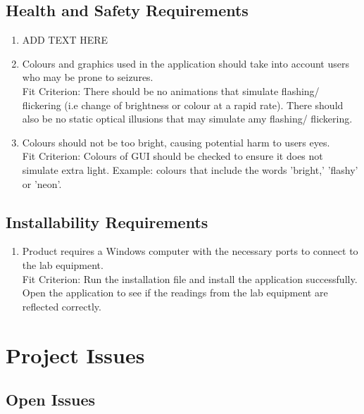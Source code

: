 \documentclass[12pt, titlepage]{article}
\begin{document}
\subsection{Health and Safety Requirements}
\begin{adjustwidth}{2.2em}{0pt}
\begin{enumerate}[{NFR-H}1.]
  \item ADD TEXT HERE
  \item Colours and graphics used in the application should take into account users who may be prone to seizures. \\
    Fit Criterion: There should be no animations that simulate flashing/ flickering (i.e change of brightness or colour at a rapid rate). There should also be no static optical illusions that may simulate amy flashing/ flickering.
    \item Colours should not be too bright, causing potential harm to users eyes. \\
    Fit Criterion: Colours of GUI should be checked to ensure it does not simulate extra light. Example: colours that include the words 'bright,' 'flashy' or 'neon'.
\end{enumerate}
\end{adjustwidth}

\subsection{Installability Requirements}
\begin{adjustwidth}{2.0em}{0pt}
\begin{enumerate}[{NFR-I}1.]
  \item Product requires a Windows computer with the necessary ports to connect to the lab equipment. \\
    Fit Criterion: Run the installation file and install the application successfully. Open the application to see if the readings from the lab equipment are reflected correctly.
\end{enumerate}
\end{adjustwidth}

\section{Project Issues}

\subsection{Open Issues}
\end{document}
